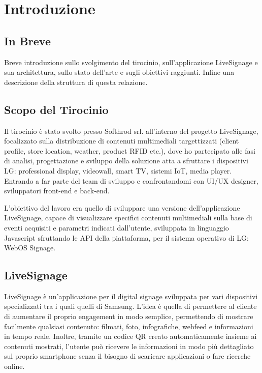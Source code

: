 \chapter{Introduzione}
\linespread{1.5}

\section{In Breve}
Breve introduzione sullo svolgimento del tirocinio, sull'applicazione LiveSignage e sua architettura, sullo stato dell'arte e sugli obiettivi raggiunti. Infine una descrizione della struttura di questa relazione.

\section{Scopo del Tirocinio}

Il tirocinio è stato svolto presso Softhrod srl. all'interno del progetto LiveSignage, focalizzato sulla distribuzione di contenuti multimediali targettizzati (client profile, store location, weather, product RFID etc.), dove ho partecipato alle fasi di analisi, progettazione e sviluppo della soluzione atta a sfruttare i dispositivi LG: professional display, videowall, smart TV, sistemi IoT, media player. Entrando a far parte del team di sviluppo e confrontandomi con UI/UX designer, sviluppatori front-end e back-end.

L'obiettivo del lavoro era quello di sviluppare una versione dell'applicazione LiveSignage, capace di visualizzare specifici contenuti multimediali sulla base di eventi acquisiti e parametri indicati dall'utente, sviluppata in linguaggio Javascript sfruttando le API  della piattaforma, per il sistema operativo di LG: WebOS Signage.

\section{LiveSignage}

LiveSignage è un’applicazione per il digital signage sviluppata per vari dispositivi specializzati tra i quali quelli di Samsung. L’idea è quella di permettere al cliente di aumentare il proprio engagement in modo semplice, permettendo di mostrare facilmente qualsiasi contenuto: filmati, foto, infografiche, webfeed e informazioni in tempo reale.
Inoltre, tramite un codice QR creato automaticamente insieme ai contenuti mostrati, l'utente può ricevere le informazioni in modo più dettagliato sul proprio smartphone senza il bisogno di scaricare applicazioni o fare ricerche online.

